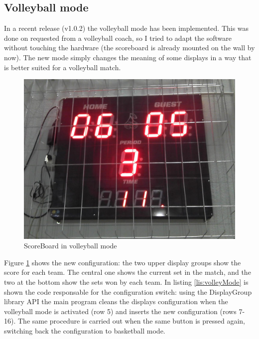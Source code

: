 \documentclass[11pt,english]{article}
\begin{document}
\subsection{Volleyball mode}

In a recent release (v1.0.2) the volleyball mode has been implemented. This was done on requested from a volleyball 
coach, so I tried to adapt the software without touching the hardware (the scoreboard is already mounted on the wall 
by now). The new mode simply changes the meaning of some displays in a way that is better suited for a volleyball 
match.
%
\begin{figure}[htb]
\centering\includegraphics[scale=0.32]{img/Scoreboard_volley}

\caption{ScoreBoard in volleyball mode \label{fig:volleyball-mode}}

\end{figure}

Figure \ref{fig:volleyball-mode} shows the new configuration: the two upper display groups show the score for each team.
The central one shows the current set in the match, and the two at the bottom show the sets won by each team.
In listing \ref{lis:volleyMode} is shown the code responsable for the configuration switch: using the DisplayGroup 
library API the main program cleans the displays configuration when the volleyball mode is activated (row 5) and 
inserts the new configuration (rows 7-16). The same procedure is carried out when the same button is pressed again,
switching back the configuration to basketball mode.
\end{document}
